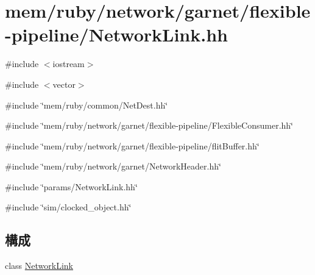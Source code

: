 \hypertarget{NetworkLink_8hh}{
\section{mem/ruby/network/garnet/flexible-\/pipeline/NetworkLink.hh}
\label{NetworkLink_8hh}
}
{\ttfamily \#include $<$iostream$>$}\par
{\ttfamily \#include $<$vector$>$}\par
{\ttfamily \#include \char`\"{}mem/ruby/common/NetDest.hh\char`\"{}}\par
{\ttfamily \#include \char`\"{}mem/ruby/network/garnet/flexible-\/pipeline/FlexibleConsumer.hh\char`\"{}}\par
{\ttfamily \#include \char`\"{}mem/ruby/network/garnet/flexible-\/pipeline/flitBuffer.hh\char`\"{}}\par
{\ttfamily \#include \char`\"{}mem/ruby/network/garnet/NetworkHeader.hh\char`\"{}}\par
{\ttfamily \#include \char`\"{}params/NetworkLink.hh\char`\"{}}\par
{\ttfamily \#include \char`\"{}sim/clocked\_\-object.hh\char`\"{}}\par
\subsection*{構成}
\begin{DoxyCompactItemize}
\item 
class \hyperlink{classNetworkLink}{NetworkLink}
\end{DoxyCompactItemize}
